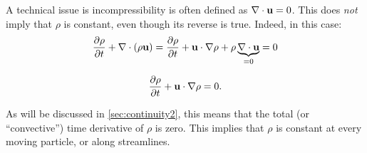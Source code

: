 A technical issue is incompressibility is often defined as $\nabla
\cdot \mathbf{u} = 0 $. This does \emph{not} imply that $\rho$ is constant,
even though its reverse is true. Indeed, in this case:
\[
\frac{\partial \rho }{\partial t} +  \nabla \cdot (\rho \mathbf{u} ) =
\frac{\partial \rho }{\partial t} +   \mathbf{u} \cdot \nabla \rho
+ \rho \underbrace{\nabla \cdot \mathbf{u}}_{=0} = 0
\]

\[
\frac{\partial \rho }{\partial t} +   \mathbf{u} \cdot \nabla \rho = 0 .
\]

As will be discussed in \ref{sec:continuity2}, this means that the
total (or ``convective'') time derivative of $\rho$ is zero. This
implies that $\rho$ is constant at every moving particle, or along
streamlines.
